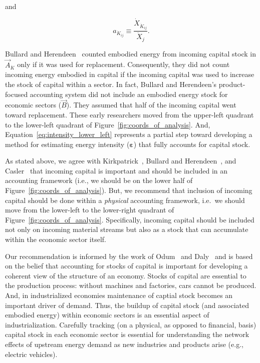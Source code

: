 \noindent{}and

\begin{equation}
	a_{\dot{K}_{ij}}
	\equiv
	\frac{\dot{X}_{\dot{K}_{ij}}}{\dot{X}_{j}}.
\end{equation}

Bullard and Herendeen~\cite{Bullard-III:1975aa}
counted embodied energy 
from incoming capital stock in $\vec{A}_{\dot{K}}$ 
only if it was used
for replacement.\cite[p.~488]{Bullard-III:1975aa}
Consequently, they did not count incoming energy embodied 
in capital if the incoming capital was used 
to increase the stock of capital within a sector.
In fact, Bullard and Herendeen's
product-focused accounting system
did not include an embodied energy stock 
for economic sectors ($\vec{B}$).
They assumed that half of the incoming capital 
went toward replacement.
These early researchers moved from the upper-left quadrant
to the lower-left quadrant of Figure~\ref{fig:coords_of_analysis}.
And, Equation~\ref{eq:intensity_lower_left} represents 
a partial step toward developing 
a method for estimating energy intensity ($\boldsymbol{\varepsilon}$)
that fully accounts for capital stock.

As stated above, we agree with Kirkpatrick~\cite{Kirkpatrick:1974te}, 
Bullard and Herendeen~\cite{Bullard-III:1975aa},
and Casler~\cite{Casler:1983uy} that incoming capital
is important and should be included in an accounting framework
(i.e., we should be on the lower half of Figure~\ref{fig:coords_of_analysis}).
But, we recommend that inclusion of incoming capital should
be done within a \emph{physical} accounting framework, 
i.e.\ we should move from the lower-left to the lower-right
quadrant of Figure~\ref{fig:coords_of_analysis}.
Specifically, incoming capital should be included 
not only on incoming material streams but also
as a stock that can accumulate within the economic sector itself.

Our recommendation is informed by the work of 
Odum~\cite{Odum1969} and Daly~\cite{Daly1995}
and is based on the belief that
accounting for stocks of capital is important for developing a coherent view
of the structure of an economy. 
Stocks of capital are essential to the production process:
without machines and factories, cars cannot be produced. 
And, in industrialized economies 
maintenance of captial stock becomes an important 
driver of demand.
Thus, the buildup of capital stock (and associated embodied energy) 
within economic sectors is an essential aspect of industrialization.
Carefully tracking (on a physical, as opposed to financial, basis) 
capital stock in each economic sector is essential 
for understanding the network effects of 
upstream energy demand as new industries and products arise 
(e.g., electric vehicles). 


